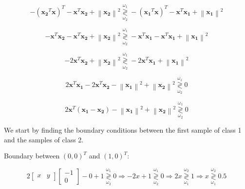 \documentclass[fleqn]{article}
\newcommand{\norm}[1]{\left \lVert #1 \right \rVert}
\begin{document}
\begin{enumerate}
		\begin{equation*}
			- (\mathbf{x_2}^T\mathbf{x})^T - \mathbf{x}^T\mathbf{x_2} + \norm{\mathbf{x_2}}^2 \overset{\omega_1}{\underset{\omega_2}{\gtrless}} - (\mathbf{x_1}^T\mathbf{x})^T - \mathbf{x}^T\mathbf{x_1} + \norm{\mathbf{x_1}}^2
		\end{equation*}
		
		\begin{equation*}
			- \mathbf{x}^T\mathbf{x_2} - \mathbf{x}^T\mathbf{x_2} + \norm{\mathbf{x_2}}^2 \overset{\omega_1}{\underset{\omega_2}{\gtrless}} - \mathbf{x}^T\mathbf{x_1} - \mathbf{x}^T\mathbf{x_1} + \norm{\mathbf{x_1}}^2
		\end{equation*}
		
		\begin{equation*}
			- 2\mathbf{x}^T\mathbf{x_2} + \norm{\mathbf{x_2}}^2 \overset{\omega_1}{\underset{\omega_2}{\gtrless}} - 2\mathbf{x}^T\mathbf{x_1} + \norm{\mathbf{x_1}}^2
		\end{equation*}
		
		\begin{equation*}
			2\mathbf{x}^T\mathbf{x_1} - 2\mathbf{x}^T\mathbf{x_2} - \norm{\mathbf{x_1}}^2 + \norm{\mathbf{x_2}}^2 \overset{\omega_1}{\underset{\omega_2}{\gtrless}} 0
		\end{equation*}
		
		\begin{equation*}
			2\mathbf{x}^T(\mathbf{x_1} - \mathbf{x_2}) - \norm{\mathbf{x_1}}^2 + \norm{\mathbf{x_2}}^2 \overset{\omega_1}{\underset{\omega_2}{\gtrless}} 0
		\end{equation*}
		
		We start by finding the boundary conditions between the first sample of class 1 and the samples of class 2.
		
		Boundary between $(0,0)^T$ and $(1,0)^T$:
		
		\begin{equation*}
			2 \begin{bmatrix} x & y \end{bmatrix} \begin{bmatrix}-1\\ 0\end{bmatrix} - 0 + 1 \overset{\omega_1}{\underset{\omega_2}{\gtrless}} 0 \Rightarrow -2x + 1 \overset{\omega_1}{\underset{\omega_2}{\gtrless}} 0 \Rightarrow 2x \overset{\omega_2}{\underset{\omega_1}{\gtrless}} 1 \Rightarrow x \overset{\omega_2}{\underset{\omega_1}{\gtrless}} 0.5			
		\end{equation*}
		

\end{enumerate}
\end{document}
